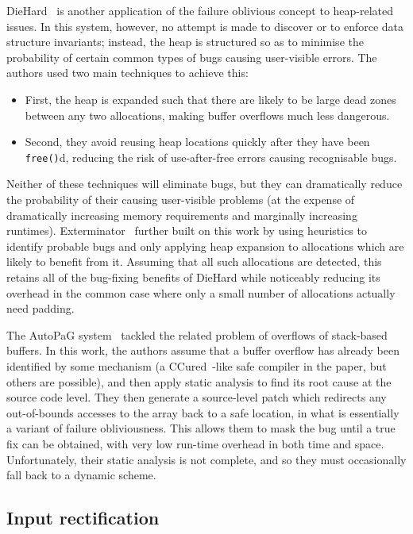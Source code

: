 DieHard~\cite{Berger2006} is another application of the failure
oblivious concept to heap-related issues.  In this system, however, no
attempt is made to discover or to enforce data structure invariants;
instead, the heap is structured so as to minimise the probability of
certain common types of bugs causing user-visible errors.  The authors
used two main techniques to achieve this:
\begin{itemize}
\item First, the heap is expanded such that there are likely to be
  large dead zones between any two allocations, making buffer
  overflows much less dangerous.
\item Second, they avoid reusing heap locations quickly after they
  have been \texttt{free()}d, reducing the risk of use-after-free
  errors causing recognisable bugs.
\end{itemize}
Neither of these techniques will eliminate bugs, but they can
dramatically reduce the probability of their causing user-visible
problems (at the expense of dramatically increasing memory
requirements and marginally increasing runtimes).
Exterminator~\cite{Novark2007} further built on this work by using
heuristics to identify probable bugs and only applying heap expansion
to allocations which are likely to benefit from it.  Assuming that all
such allocations are detected, this retains all of the bug-fixing
benefits of DieHard while noticeably reducing its overhead in the
common case where only a small number of allocations actually need
padding.

The AutoPaG system~\cite{Lin2007} tackled the related problem of
overflows of stack-based buffers.  In this work, the authors assume
that a buffer overflow has already been identified by some mechanism
(a CCured~\cite{Necula2005}-like safe compiler in the paper, but
others are possible), and then apply static analysis to find its root
cause at the source code level.  They then generate a source-level
patch which redirects any out-of-bounds accesses to the array back to
a safe location, in what is essentially a variant of failure
obliviousness.  This allows them to mask the bug until a true fix can
be obtained, with very low run-time overhead in both time and space.
Unfortunately, their static analysis is not complete, and so they must
occasionally fall back to a dynamic scheme.

\subsection{Input rectification}

